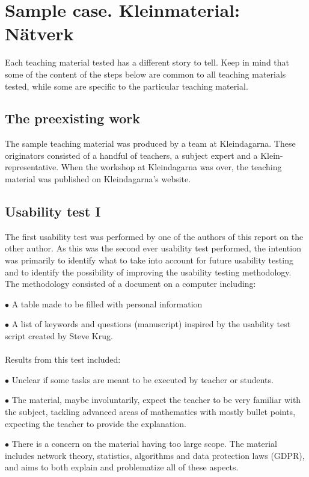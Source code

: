 \section{Sample case. Kleinmaterial: Nätverk}
Each teaching material tested has a different story to tell. Keep in mind that some of the content of the steps below are common to all teaching materials tested, while some are specific to the particular teaching material.

\subsection{The preexisting work}
The sample teaching material was produced by a team at Kleindagarna. These originators consisted of a handful of teachers, a subject expert and a Klein-representative. When the workshop at Kleindagarna was over, the teaching material was published on Kleindagarna's website. 

\subsection{Usability test I}
The first usability test was performed by one of the authors of this report on the other author. As this was the second ever usability test performed, the intention was primarily to identify what to take into account for future usability testing and to identify the possibility of improving the usability testing methodology. The methodology consisted of a document on a computer including:
\begin{description}
    \item $\bullet$ A table made to be filled with personal information
    \item $\bullet$ A list of keywords and questions (manuscript) inspired by the usability test script created by Steve Krug.
\end{description}

\paragraph*{}
Results from this test included:
\begin{description}
    \item $\bullet$ Unclear if some tasks are meant to be executed by teacher or students.
    \item $\bullet$ The material, maybe involuntarily, expect the teacher to be very familiar with the subject, tackling advanced areas of mathematics with mostly bullet points, expecting the teacher to provide the explanation.
    \item $\bullet$ There is a concern on the material having too large scope. The material includes network theory, statistics, algorithms and data protection laws (GDPR), and aims to both explain and problematize all of these aspects.
\end{description}
